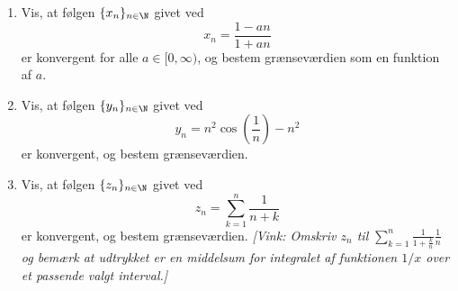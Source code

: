 \begin{opg}\hfill
	\begin{enumerate}
		\item Vis, at f\o{}lgen $\{x_n\}_{n\in\N}$ givet ved
		\[
		x_n=\frac{1-an}{1+an}
		\]	
		er konvergent for alle $a\in [0,\infty)$, og bestem gr\ae{}nsev\ae{}rdien som en funktion af $a$.
		
		
		
		\item Vis, at f\o{}lgen $\{y_n\}_{n\in\N}$ givet ved
		\[
		y_n=n^2\cos\left(\frac1n\right)-n^2
		\]	
		er konvergent, og bestem gr\ae{}nsev\ae{}rdien.
		
		
		
		\item Vis, at f\o{}lgen $\{z_n\}_{n\in\N}$ givet ved
		\[
		z_n=\sum_{k=1}^n\frac1{n+k}
		\]	
		er konvergent, og bestem gr\ae{}nsev\ae{}rdien. \textsl{[Vink: Omskriv 
			$
			z_n$ til $\sum_{k=1}^n\frac1{1+\frac kn}\frac 1n
			$
			og bem\ae{}rk at udtrykket er en middelsum for integralet af funktionen $1/x$ over et passende valgt interval.]}
		

\end{enumerate}
\end{opg}
